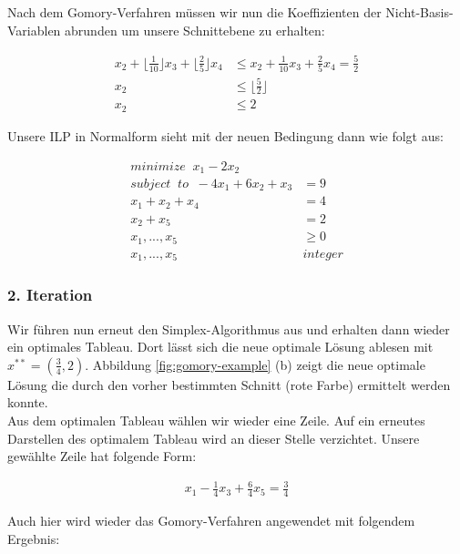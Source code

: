 \documentclass[tog]{acmsiggraph}
\begin{document}
Nach dem Gomory-Verfahren müssen wir nun die Koeffizienten der Nicht-Basis-Variablen abrunden um unsere Schnittebene zu erhalten:

\large
\begin{align}
\label{Eq:Gomory-Beispiel It 1 - 2}
x_2 + \lfloor \frac{1}{10}\rfloor x_3 + \lfloor\frac{2}{5}\rfloor x_4 &\leq x_2 + \frac{1}{10} x_3 + \frac{2}{5} x_4 = \frac{5}{2} \nonumber \\
x_2 &\leq \lfloor \frac{5}{2} \rfloor \nonumber \\
x_2 &\leq 2
\end{align}
\normalsize

Unsere ILP in Normalform sieht mit der neuen Bedingung dann wie folgt aus:

\large
\begin{align}
\label{Eq:Gomory-Beispiel-ILP-Normal-It2}
minimize \;\; x_1 - 2x_2 & \nonumber \\
subject \;\; to \;\; -4x_1 + 6x_2 + x_3 &= 9 \nonumber \\
x_1 + x_2 + x_4 &= 4 \nonumber \\
x_2 + x_5 &= 2 \nonumber \\
x_1, ..., x_5 &\geq 0 \nonumber \\
x_1, ..., x_5 \;\; &integer
\end{align}
\normalsize

\subsubsection*{2. Iteration}

Wir führen nun erneut den Simplex-Algorithmus aus und erhalten dann wieder ein optimales Tableau. Dort lässt sich die neue optimale Lösung ablesen mit $x^{**} = (\frac{3}{4}, 2)$. Abbildung \ref{fig:gomory-example} (b) zeigt die neue optimale Lösung die durch den vorher bestimmten Schnitt (rote Farbe) ermittelt werden konnte.\\
Aus dem optimalen Tableau wählen wir wieder eine Zeile. Auf ein erneutes Darstellen des optimalem Tableau wird an dieser Stelle verzichtet. Unsere gewählte Zeile hat folgende Form:

\large
\begin{align}
\label{Eq:Gomory-Beispiel It 2 schritt 1}
x_1 - \frac{1}{4} x_3 + \frac{6}{4} x_5 = \frac{3}{4}
\end{align}
\normalsize

Auch hier wird wieder das Gomory-Verfahren angewendet mit folgendem Ergebnis:
\end{document}
